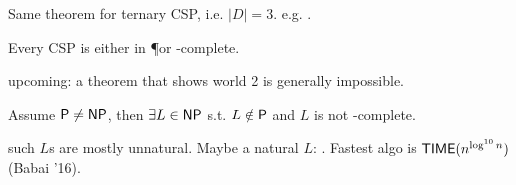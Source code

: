 \documentclass{article}
\begin{document}
\begin{theorem}[Bulatov '06]
  Same theorem for ternary CSP, i.e. \(|D| = 3\). e.g. .
\end{theorem}

\begin{conjecture}
  Every CSP is either in \P or \NP-complete.
\end{conjecture}

upcoming: a theorem that shows world 2 is generally impossible.

\begin{theorem}
  Assume \(\P \neq \NP\), then \( \exists L \in \NP \) s.t. \( L \notin \P \) and \(L\) is not \NP-complete.
\end{theorem}

such \(L\)s are mostly unnatural. Maybe a natural \(L\): . Fastest algo is \(\TIME(n^{\log^{10} n})\) (Babai '16).
\end{document}
